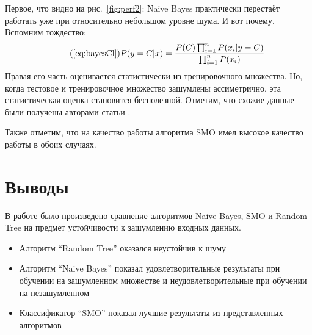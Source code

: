 \documentclass{article}
\begin{document}
Первое, что видно на рис.~\ref{fig:perf2}: Naive Bayes практически перестаёт работать уже при относительно небольшом уровне шума. И вот почему. Вспомним тождество:
\begin{equation}
\tag{\ref{eq:bayesCl}}
P(y=C|x)=\frac{P(C) \prod_{i=1}^n{P(x_i|y=C)}}{\prod_{i=1}^n{P(x_i)}}
\end{equation}
Правая его часть оценивается статистически из тренировочного множества. Но, когда тестовое и тренировочное множество зашумлены ассиметрично, эта статистическая оценка становится бесполезной.
 Отметим, что схожие данные были получены авторами статьи \cite{glick2004enrichment}. 
 
 Также отметим, что на качество работы алгоритма SMO имел высокое качество работы в обоих случаях.


\section{Выводы}
В работе было произведено сравнение алгоритмов Naive Bayes, SMO и Random Tree на предмет устойчивости к зашумлению входных данных. 
\begin{itemize}
\item{Алгоритм ``Random Tree'' оказался неустойчив к шуму}
\item{Алгоритм ``Naive Bayes'' показал удовлетворительные результаты при обучении на зашумленном множестве и неудовлетворительные при обучении на незашумленном}
\item{Классификатор ``SMO'' показал лучшие результаты из представленных алгоритмов}
\end{itemize}
\clearpage

{}
\end{document}
